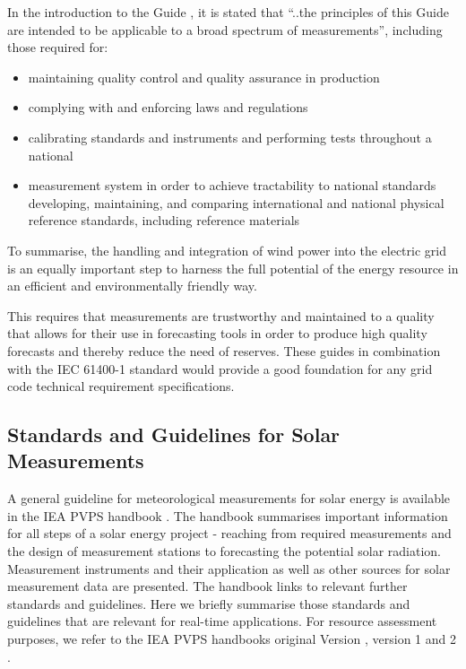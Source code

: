 In the introduction to the Guide \cite{jcgm2009}, it is stated that “..the principles of this Guide are intended to be applicable to a broad spectrum of measurements”, including those required for:
\begin{itemize}
   \item maintaining quality control and quality assurance in production
   \item complying with and enforcing laws and regulations
   \item calibrating standards and instruments and performing tests throughout a national 
   \item measurement system in order to achieve tractability to national standards developing, maintaining, and comparing international and national physical reference standards, including reference materials 
\end{itemize}

To summarise, the handling and integration of wind power into the electric grid is an equally important step to harness the full potential of the energy resource in an efficient and environmentally friendly way. 

This requires that measurements are trustworthy and maintained to a quality that allows for their use in forecasting tools in order to produce high quality forecasts and thereby reduce the need of reserves. These guides in combination with the IEC 61400-1 standard would provide a good foundation for any grid code technical requirement specifications. 


\subsection{Standards and Guidelines for Solar Measurements}\label{subsec:solar_standards}
A general guideline for meteorological measurements for solar energy is available in the IEA PVPS handbook \cite{nrelhandbook2021}. The handbook summarises important information for all steps of a solar energy project - reaching from required measurements and the design of measurement stations to forecasting the potential solar radiation. Measurement instruments and their application as well as other sources for solar measurement data are presented. The handbook links to relevant further standards and guidelines. Here we briefly summarise those standards and guidelines that are relevant for real-time applications. For resource assessment purposes, we refer to the IEA PVPS handbooks original Version \cite{nrelhandbook2015}, version 1\cite{nrelhandbook2017} and 2 \cite{nrelhandbook2021}.

